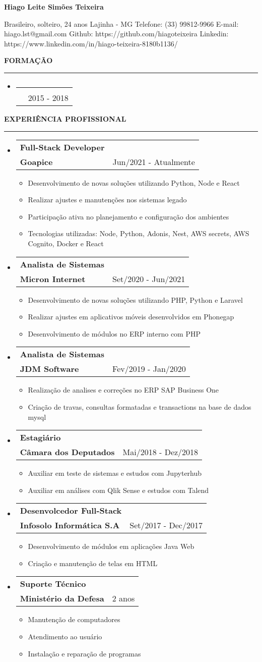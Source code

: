 \documentclass[a4paper,10pt]{article}
\makeatletter
\newcommand{\EducationItem}[3]{
    \item
    \begin{tabular*}{0.93\textwidth}[t]{l@{\extracolsep{\fill}}r}
        \normalfont{#1} & \\
        \small\normalfont{#2} & \scriptsize#3
    \end{tabular*}
}
\newcommand{\WorkExpItem}[3]{
    \item
        \begin{tabular*}{0.93\textwidth}[t]{l@{\extracolsep{\fill}}r}
            \textbf{#1} & \\
            \small\textbf{#2} & \scriptsize#3 \\
        \end{tabular*}
}
\newcommand{\WorkExpActivitiesBegin}[0]{
    \vspace{-5pt}\begin{itemize}
}
\newcommand{\WorkExpActivitiesItem}[1]{
    \vspace{-2pt}\item[]\small #1
}
\newcommand{\WorkExpActivitiesEnd}[0]{
    \end{itemize}\vspace{-7pt}
}
\newcommand{\SectionTitle}[1]{
    \begin{flushleft}
    \textbf{#1}
    \noindent\textcolor{gray}{\rule{18.5cm}{1px}}
    \end{flushleft}
}
\newcommand{\SectionBegin}[0]{
    \vspace{-16pt}\begin{flushleft}
    \begin{itemize}
}
\newcommand{\SectionEnd}[0]{
    \end{itemize}
    \end{flushleft}\vspace{-2pt}
}
\newcommand{\PersonInformation}[7]{
    \begin{flushleft}
        \begin{LARGE}
            \textbf{#1}
        \end{LARGE}
    \end{flushleft}

    \begin{flushleft}
        #2
        \newline
        #3
        \newline
        Telefone: #4
        \newline
        E-mail: #5
        \newline
        Github: #6
        \newline
        Linkedin: #7
        \newline
    \end{flushleft}
}
\makeatother
\begin{document}

\PersonInformation
    {Hiago Leite Simões Teixeira}
    {Brasileiro, solteiro, 24 anos}
    {Lajinha - MG}
    {(33) 99812-9966}
    {hiago.lst@gmail.com}
    {https://github.com/hiagoteixeira}
    {https://www.linkedin.com/in/hiago-teixeira-8180b1136/}

\SectionTitle
    {FORMA\c{C}\~{A}O}
\SectionBegin
    \EducationItem
        {Bacharel em Ciência da Computação}
        {Centro Universitário de Brasília - UniCEUB}
        {2015 - 2018}
\SectionEnd

\SectionTitle
    {EXPERI\^{E}NCIA PROFISSIONAL}
\SectionBegin
    \WorkExpItem
        {Full-Stack Developer}
        {Goapice}
        {Jun/2021 - Atualmente}
        \WorkExpActivitiesBegin
            \WorkExpActivitiesItem{Desenvolvimento de novas solu\c{c}\~{o}es utilizando Python, Node e React}
            \WorkExpActivitiesItem{Realizar ajustes e manutenções nos sistemas legado}
            \WorkExpActivitiesItem{Participação ativa no planejamento e configura\c{c}\~{a}o dos ambientes}
            \WorkExpActivitiesItem{Tecnologias utilizadas: Node, Python, Adonis, Nest, AWS secrets, AWS Cognito, Docker e React}
        \WorkExpActivitiesEnd

    \WorkExpItem
        {Analista de Sistemas}
        {Micron Internet}
        {Set/2020 - Jun/2021}
        \WorkExpActivitiesBegin
            \WorkExpActivitiesItem{Desenvolvimento de novas solu\c{c}\~{o}es utilizando PHP, Python e Laravel}
            \WorkExpActivitiesItem{Realizar ajustes em aplicativos móveis desenvolvidos em Phonegap}
            \WorkExpActivitiesItem{Desenvolvimento de módulos no ERP interno com PHP}
        \WorkExpActivitiesEnd
    \WorkExpItem
        {Analista de Sistemas}
        {JDM Software}
        {Fev/2019 - Jan/2020}
        \WorkExpActivitiesBegin
            \WorkExpActivitiesItem{Realiza\c{c}\~{a}o de analises e corre\c{c}\~{o}es no ERP SAP Business One}
            \WorkExpActivitiesItem{Cria\c{c}\~{a}o de travas, consultas formatadas e transactions na base de dados mysql}
        \WorkExpActivitiesEnd
    \WorkExpItem
        {Estagiário}
        {C\^{a}mara dos Deputados}
        {Mai/2018 - Dez/2018}
        \WorkExpActivitiesBegin
            \WorkExpActivitiesItem{Auxiliar em teste de sistemas e estudos com Jupyterhub}
            \WorkExpActivitiesItem{Auxiliar em análises com Qlik Sense e estudos com Talend}
        \WorkExpActivitiesEnd
    \WorkExpItem
        {Desenvolcedor Full-Stack}
        {Infosolo Informática S.A}
        {Set/2017 - Dec/2017}
        \WorkExpActivitiesBegin
            \WorkExpActivitiesItem{Desenvolvimento de módulos em aplicações Java Web}
            \WorkExpActivitiesItem{Criação e manutenção de telas em HTML}
        \WorkExpActivitiesEnd
    \WorkExpItem
        {Suporte Técnico}
        {Ministério da Defesa}
        {2 anos}
        \WorkExpActivitiesBegin
            \WorkExpActivitiesItem{Manutenção de computadores}
            \WorkExpActivitiesItem{Atendimento ao usuário}
            \WorkExpActivitiesItem{Instalação e reparação de programas}
        \WorkExpActivitiesEnd
\SectionEnd
\end{document}
